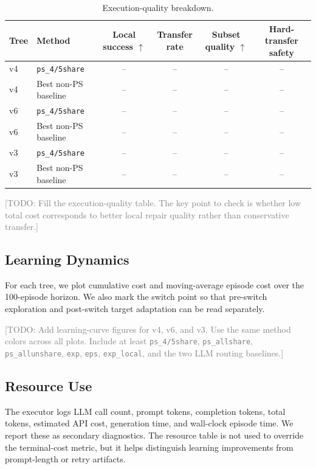 \begin{table}[t]
    \centering
    \small
    \caption{Execution-quality breakdown.}
    \label{tab:execution_quality}
    \begin{tabular}{llcccc}
        \toprule
        Tree & Method & Local success $\uparrow$ & Transfer rate & Subset quality $\uparrow$ & Hard-transfer safety \\
        \midrule
        v4 & \texttt{ps\_4/5share} & -- & -- & -- & -- \\
        v4 & Best non-PS baseline & -- & -- & -- & -- \\
        v6 & \texttt{ps\_4/5share} & -- & -- & -- & -- \\
        v6 & Best non-PS baseline & -- & -- & -- & -- \\
        v3 & \texttt{ps\_4/5share} & -- & -- & -- & -- \\
        v3 & Best non-PS baseline & -- & -- & -- & -- \\
        \bottomrule
    \end{tabular}
\end{table}

\textcolor{gray}{[TODO: Fill the execution-quality table. The key point to check is whether low total cost corresponds to better local repair quality rather than conservative transfer.]}

\subsection{Learning Dynamics}
\label{sec:exp_learning_dynamics}

For each tree, we plot cumulative cost and moving-average episode cost over the 100-episode horizon. We also mark the switch point so that pre-switch exploration and post-switch target adaptation can be read separately.

\textcolor{gray}{[TODO: Add learning-curve figures for v4, v6, and v3. Use the same method colors across all plots. Include at least \texttt{ps\_4/5share}, \texttt{ps\_allshare}, \texttt{ps\_allunshare}, \texttt{exp}, \texttt{eps}, \texttt{exp\_local}, and the two LLM routing baselines.]}

\subsection{Resource Use}
\label{sec:exp_resource_use}

The executor logs LLM call count, prompt tokens, completion tokens, total tokens, estimated API cost, generation time, and wall-clock episode time. We report these as secondary diagnostics. The resource table is not used to override the terminal-cost metric, but it helps distinguish learning improvements from prompt-length or retry artifacts.

